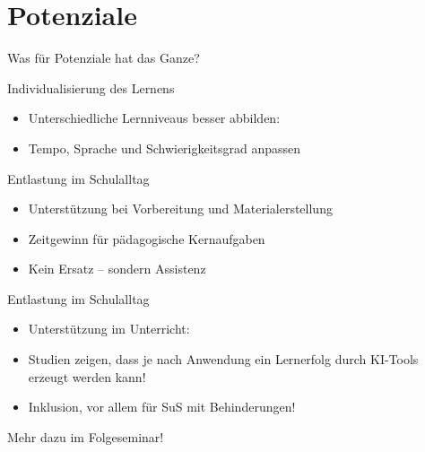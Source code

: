 \documentclass[14pt, aspectratio=169]{beamer}
\begin{document}

\section{Potenziale}

\begin{frame}{}
\begin{center}
    \Large Was für Potenziale hat das Ganze?
\end{center}
\end{frame}

\begin{frame}{Individualisierung des Lernens}
\begin{itemize}
    \item Unterschiedliche Lernniveaus besser abbilden:
    \item Tempo, Sprache und Schwierigkeitsgrad anpassen
\end{itemize}
\end{frame}

\begin{frame}{Entlastung im Schulalltag}
\begin{itemize}
    \item Unterstützung bei Vorbereitung und Materialerstellung
    \item Zeitgewinn für pädagogische Kernaufgaben
    \item Kein Ersatz – sondern Assistenz
\end{itemize}
\end{frame}

\begin{frame}{Entlastung im Schulalltag}
\begin{itemize}
    \item Unterstützung im Unterricht:
    \item Studien zeigen, dass je nach Anwendung ein Lernerfolg durch KI-Tools erzeugt werden kann!
    \item Inklusion, vor allem für SuS mit Behinderungen!
\end{itemize}
\begin{center}
    Mehr dazu im Folgeseminar!
    \begin{tiny}
        \autocites{orhani_risks_2025}{kumar_ai_2025}
    \end{tiny}
\end{center}
\end{frame}
\end{document}
